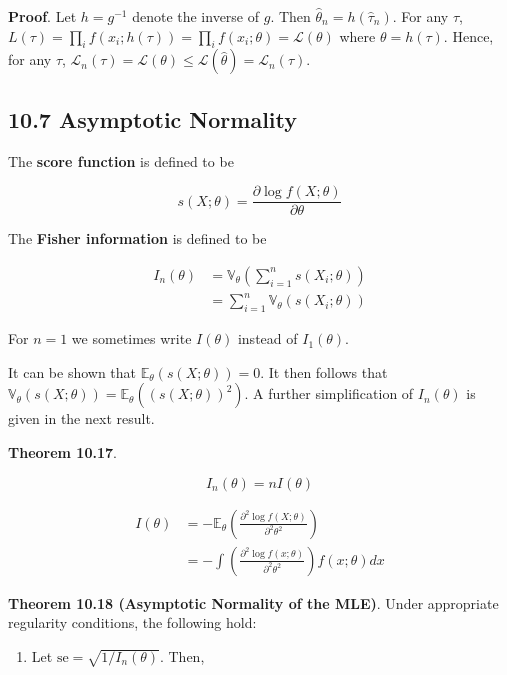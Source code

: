 \textbf{Proof}. Let \(h = g^{-1}\) denote the inverse of \(g\). Then
\(\hat{\theta}_{n} = h(\hat{\tau}_{n})\). For any \(\tau\),
\(L(\tau) = \prod_{i} f(x_{i}; h(\tau)) = \prod_{i} f(x_{i}; \theta) = \mathcal{L}(\theta)\)
where \(\theta = h(\tau)\). Hence, for any \(\tau\),
\(\mathcal{L}_{n}(\tau) = \mathcal{L}(\theta) \leq \mathcal{L}(\hat{\theta}) = \mathcal{L}_{n}(\hat{\tau})\).

\subsection*{10.7 Asymptotic Normality}\label{asymptotic-normality}

The \textbf{score function} is defined to be

\[ s(X; \theta) = \frac{\partial \log f(X; \theta)}{\partial \theta} \]

The \textbf{Fisher information} is defined to be

\begin{align*}
I_{n}(\theta) &= \mathbb{V}_\theta \left( \sum_{i=1}^{n} s(X_{i}; \theta) \right) \\
&= \sum_{i=1}^{n} \mathbb{V}_\theta(s(X_{i}; \theta))
\end{align*}

For \(n = 1\) we sometimes write \(I(\theta)\) instead of
\(I_{1}(\theta)\).

It can be shown that \(\mathbb{E}_\theta(s(X; \theta)) = 0\). It then
follows that
\(\mathbb{V}_\theta(s(X; \theta)) = \mathbb{E}_\theta((s(X; \theta))^{2})\).
A further simplification of \(I_{n}(\theta)\) is given in the next result.

\textbf{Theorem 10.17}.

\[ I_{n}(\theta) = n I(\theta)\]

\begin{align*}
I(\theta) & = -\mathbb{E}_\theta \left( \frac{\partial^{2} \log f(X; \theta)}{\partial^{2} \theta^{2}} \right) \\
&= - \int \left( \frac{\partial^{2} \log f(x; \theta)}{\partial^{2} \theta^{2}} \right) f(x; \theta) dx
\end{align*}

\textbf{Theorem 10.18 (Asymptotic Normality of the MLE)}. Under
appropriate regularity conditions, the following hold:

\begin{enumerate}[tightlist,label={\arabic*.}]
\item
  Let \(\text{se} = \sqrt{1 / I_{n}(\theta)}\). Then,
\end{enumerate}

